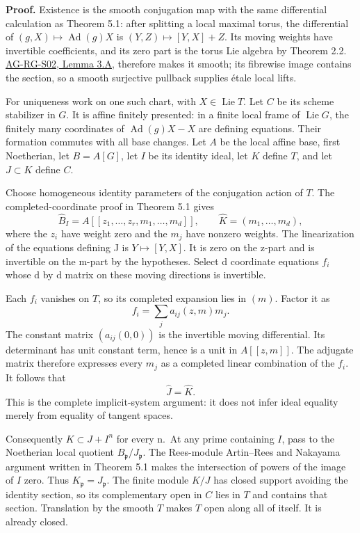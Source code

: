 \documentclass[11pt,a4paper,openany]{report}
\begin{document}
\textbf{Proof.} Existence is the smooth conjugation map with the same differential calculation as Theorem 5.1: after splitting a local maximal torus, the differential of \((g,X)\mapsto\operatorname{Ad}(g)X\) is \((Y,Z)\mapsto[Y,X]+Z\). Its moving weights have invertible coefficients, and its zero part is the torus Lie algebra by Theorem 2.2. \href{AG-RG-S02.html\#smooth-map-differential}{AG-RG-S02, Lemma 3.A}, therefore makes it smooth; its fibrewise image contains the section, so a smooth surjective pullback supplies étale local lifts.

For uniqueness work on one such chart, with \(X\in\operatorname{Lie}T\). Let \(C\) be its scheme stabilizer in \(G\). It is affine finitely presented: in a finite local frame of \(\operatorname{Lie}G\), the finitely many coordinates of \(\operatorname{Ad}(g)X-X\) are defining equations. Their formation commutes with all base changes. Let \(A\) be the local affine base, first Noetherian, let \(B=A[G]\), let \(I\) be its identity ideal, let \(K\) define \(T\), and let \(J\subset K\) define \(C\).

Choose homogeneous identity parameters of the conjugation action of \(T\). The completed-coordinate proof in Theorem 5.1 gives \[
\widehat B_I=A[[z_1,\ldots,z_r,m_1,\ldots,m_d]],
\qquad \widehat K=(m_1,\ldots,m_d),
\] where the \(z_i\) have weight zero and the \(m_j\) have nonzero weights. The linearization of the equations defining J is \(Y\mapsto[Y,X]\). It is zero on the z-part and is invertible on the m-part by the hypotheses. Select d coordinate equations \(f_i\) whose d by d matrix on these moving directions is invertible.

Each \(f_i\) vanishes on \(T\), so its completed expansion lies in \((m)\). Factor it as \[
f_i=\sum_j a_{ij}(z,m)m_j.
\] The constant matrix \((a_{ij}(0,0))\) is the invertible moving differential. Its determinant has unit constant term, hence is a unit in \(A[[z,m]]\). The adjugate matrix therefore expresses every \(m_j\) as a completed linear combination of the \(f_i\). It follows that \[
\widehat J=\widehat K.
\] This is the complete implicit-system argument: it does not infer ideal equality merely from equality of tangent spaces.

Consequently \(K\subset J+I^n\) for every n.~At any prime containing \(I\), pass to the Noetherian local quotient \(B_\mathfrak p/J_\mathfrak p\). The Rees-module Artin--Rees and Nakayama argument written in Theorem 5.1 makes the intersection of powers of the image of \(I\) zero. Thus \(K_\mathfrak p=J_\mathfrak p\). The finite module \(K/J\) has closed support avoiding the identity section, so its complementary open in \(C\) lies in \(T\) and contains that section. Translation by the smooth \(T\) makes \(T\) open along all of itself. It is already closed.
\end{document}
